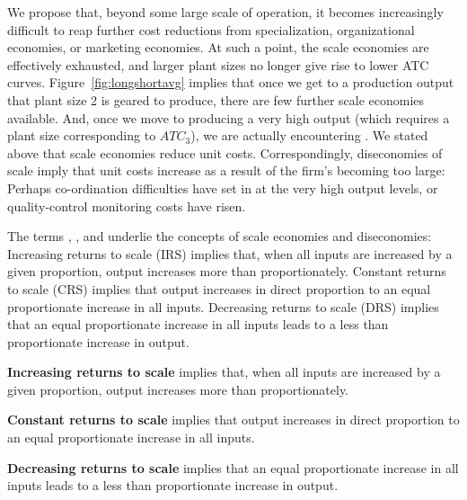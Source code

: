 

We propose that, beyond some large scale of operation, it becomes increasingly difficult to reap further cost reductions from specialization, organizational economies, or marketing economies. At such a point, the scale economies are effectively exhausted, and larger plant sizes no longer give rise to lower ATC curves. Figure~\ref{fig:longshortavg} implies that once we get to a production output that plant size 2 is geared to produce, there are few further scale economies available. And, once we move to producing a very high output (which requires a plant size corresponding to $ATC_3$), we are actually encountering . We stated above that scale economies reduce unit costs. Correspondingly, diseconomies of scale imply that unit costs increase as a result of the firm's becoming too large: Perhaps co-ordination difficulties have set in at the very high output levels, or quality-control monitoring costs have risen.

The terms , , and  underlie the concepts of scale economies and diseconomies: Increasing returns to scale (IRS) implies that, when all inputs are increased by a given proportion, output increases more than proportionately. Constant returns to scale (CRS) implies that output increases in direct proportion to an equal proportionate increase in all inputs. Decreasing returns to scale (DRS) implies that an equal proportionate increase in all inputs leads to a less than proportionate increase in output.

\begin{DefBox}
\textbf{Increasing returns to scale} implies that, when all inputs are increased by a given proportion, output increases more than proportionately.

\textbf{Constant returns to scale} implies that output increases in direct proportion to an equal proportionate increase in all inputs.

\textbf{Decreasing returns to scale} implies that an equal proportionate increase in all inputs leads to a less than proportionate increase in output.
\end{DefBox}

